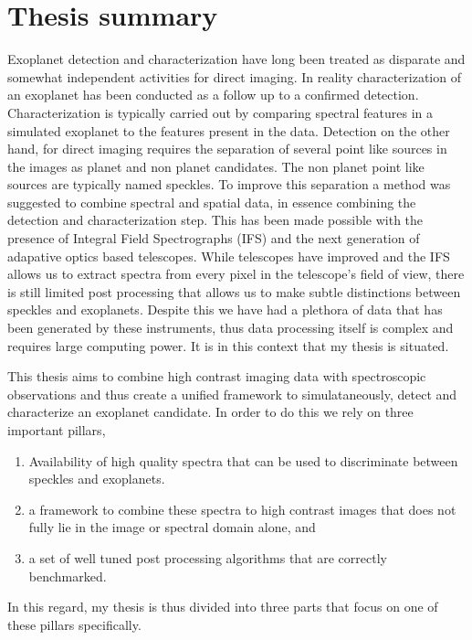 \chapter*{Thesis summary}
Exoplanet detection and characterization have long been treated as disparate and somewhat independent activities for direct imaging. 
In reality characterization of an exoplanet has been conducted as a follow up to a confirmed detection.
Characterization is typically carried out by comparing spectral features in a simulated exoplanet to the features present \@
in the data.
Detection on the other hand, for direct imaging requires the separation of several point like sources in the images as planet\@
and non planet candidates.
The non planet point like sources are typically named speckles. 
To improve this separation a method was suggested to combine spectral and spatial data, in essence combining the detection 
and characterization step.
This has been made possible with the presence of Integral Field Spectrographs (IFS) and the next generation of adapative optics based 
telescopes.
While telescopes have improved and the IFS allows us to extract spectra from every pixel in the telescope's field of view, there is still 
limited post processing that allows us to make subtle distinctions between speckles and exoplanets.
Despite this we have had a plethora of data that has been generated by these instruments, thus data processing itself is complex and requires 
large computing power.
It is in this context that my thesis is situated.

This thesis aims to combine high contrast imaging data with spectroscopic observations and thus create a unified framework to simulataneously,
detect and characterize an exoplanet candidate.
In order to do this we rely on three important pillars,
\begin{enumerate}
    \item Availability of high quality spectra that can be used to discriminate between speckles and exoplanets.
    \item a framework to combine these spectra to high contrast images that does not fully lie in the image or spectral domain alone, and
    \item a set of well tuned post processing algorithms that are correctly benchmarked.
\end{enumerate}
In this regard, my thesis is thus divided into three parts that focus on one of these pillars specifically.